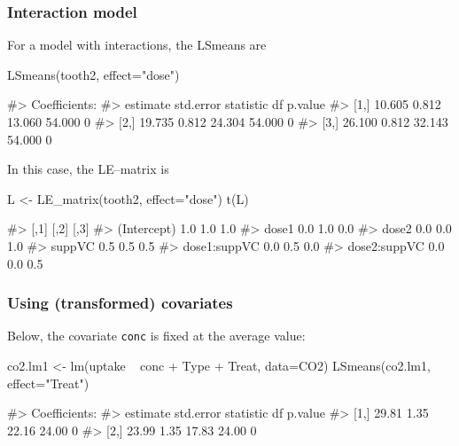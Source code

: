 \hypertarget{interaction-model}{%
\subsubsection{Interaction model}\label{interaction-model}}

For a model with interactions, the LSmeans are

\begin{Schunk}
\begin{Sinput}
LSmeans(tooth2, effect="dose")
\end{Sinput}
\begin{Soutput}
#> Coefficients:
#>      estimate std.error statistic     df p.value
#> [1,]   10.605     0.812    13.060 54.000       0
#> [2,]   19.735     0.812    24.304 54.000       0
#> [3,]   26.100     0.812    32.143 54.000       0
\end{Soutput}
\end{Schunk}

In this case, the LE--matrix is

\begin{Schunk}
\begin{Sinput}
L <- LE_matrix(tooth2, effect="dose")
t(L)
\end{Sinput}
\begin{Soutput}
#>              [,1] [,2] [,3]
#> (Intercept)   1.0  1.0  1.0
#> dose1         0.0  1.0  0.0
#> dose2         0.0  0.0  1.0
#> suppVC        0.5  0.5  0.5
#> dose1:suppVC  0.0  0.5  0.0
#> dose2:suppVC  0.0  0.0  0.5
\end{Soutput}
\end{Schunk}

\hypertarget{using-transformed-covariates}{%
\subsubsection{Using (transformed)
covariates}\label{using-transformed-covariates}}

Below, the covariate \texttt{conc} is fixed at the average value:

\begin{Schunk}
\begin{Sinput}
co2.lm1 <- lm(uptake ~ conc + Type + Treat, data=CO2)
LSmeans(co2.lm1, effect="Treat")
\end{Sinput}
\begin{Soutput}
#> Coefficients:
#>      estimate std.error statistic    df p.value
#> [1,]    29.81      1.35     22.16 24.00       0
#> [2,]    23.99      1.35     17.83 24.00       0
\end{Soutput}
\end{Schunk}


